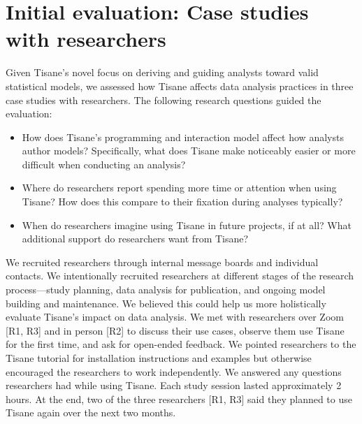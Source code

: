 \section{Initial evaluation: Case studies with researchers}\label{sec:tisane_case_studies}
Given Tisane's novel focus on deriving and
guiding analysts toward valid statistical models, we assessed how Tisane affects
data analysis practices in three case studies with researchers. The following research questions guided
the evaluation:
\begin{itemize}
    \item \rqWorkflow How does Tisane's programming and interaction model
    affect how analysts author models? Specifically, what does Tisane make
    noticeably easier or more difficult when conducting an analysis?
    \item \rqCognitive Where do researchers report spending more
    time or attention when using Tisane? How does this compare to their
    fixation during analyses typically?
    \item \rqFuture When do researchers imagine using Tisane
    in future projects, if at all? What additional support do researchers want
    from Tisane? 
\end{itemize}

We recruited researchers through internal message boards and individual
contacts. We intentionally recruited researchers at different stages of the
research process---study planning, data analysis for publication, and ongoing
model building and maintenance. We believed this could help us more holistically
evaluate Tisane's impact on data analysis. We met with researchers over Zoom
[R1, R3] and in person [R2] to discuss their use cases, observe them use
Tisane for the first time, and ask for open-ended feedback. We pointed researchers to the Tisane tutorial for
installation instructions and examples but otherwise encouraged the researchers
to work independently. We answered any questions researchers had while using Tisane.
Each study session lasted approximately 2 hours. At the end, two of the three
researchers [R1, R3] said they planned to use Tisane again over the next two months.

